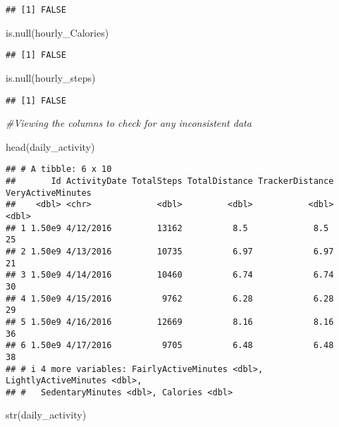 \documentclass[
]{article}
\newenvironment{Shaded}{\begin{snugshade}}{\end{snugshade}}
\newcommand{\CommentTok}[1]{\textcolor[rgb]{0.56,0.35,0.01}{\textit{#1}}}
\newcommand{\FunctionTok}[1]{\textcolor[rgb]{0.00,0.00,0.00}{#1}}
\newcommand{\NormalTok}[1]{#1}
\begin{document}
\begin{verbatim}
## [1] FALSE
\end{verbatim}

\begin{Shaded}
\begin{Highlighting}[]
\FunctionTok{is.null}\NormalTok{(hourly\_Calories)}
\end{Highlighting}
\end{Shaded}

\begin{verbatim}
## [1] FALSE
\end{verbatim}

\begin{Shaded}
\begin{Highlighting}[]
\FunctionTok{is.null}\NormalTok{(hourly\_steps)}
\end{Highlighting}
\end{Shaded}

\begin{verbatim}
## [1] FALSE
\end{verbatim}

\begin{Shaded}
\begin{Highlighting}[]
\CommentTok{\#Viewing the columns to check for any inconsistent data }

\FunctionTok{head}\NormalTok{(daily\_activity)}
\end{Highlighting}
\end{Shaded}

\begin{verbatim}
## # A tibble: 6 x 10
##       Id ActivityDate TotalSteps TotalDistance TrackerDistance VeryActiveMinutes
##    <dbl> <chr>             <dbl>         <dbl>           <dbl>             <dbl>
## 1 1.50e9 4/12/2016         13162          8.5             8.5                 25
## 2 1.50e9 4/13/2016         10735          6.97            6.97                21
## 3 1.50e9 4/14/2016         10460          6.74            6.74                30
## 4 1.50e9 4/15/2016          9762          6.28            6.28                29
## 5 1.50e9 4/16/2016         12669          8.16            8.16                36
## 6 1.50e9 4/17/2016          9705          6.48            6.48                38
## # i 4 more variables: FairlyActiveMinutes <dbl>, LightlyActiveMinutes <dbl>,
## #   SedentaryMinutes <dbl>, Calories <dbl>
\end{verbatim}

\begin{Shaded}
\begin{Highlighting}[]
\FunctionTok{str}\NormalTok{(daily\_activity)}
\end{Highlighting}
\end{Shaded}
\end{document}
